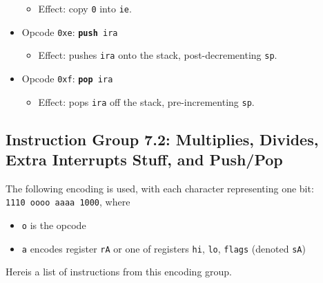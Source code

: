 \documentclass{article}
\begin{document}
\begin{itemize}
\begin{itemize}
			\item Effect:  copy \texttt{0} into \texttt{ie}.
		\end{itemize}
		\item Opcode \texttt{0xe}:
			\texttt{\textbf{push} ira}
		\begin{itemize}
			\item Effect:  pushes \texttt{ira} onto the stack,
			post-decrementing \texttt{sp}.
		\end{itemize}
		\item Opcode \texttt{0xf}:
			\texttt{\textbf{pop} ira}
		\begin{itemize}
			\item Effect:  pops \texttt{ira} off the stack,
			pre-incrementing \texttt{sp}.
		\end{itemize}
	\end{itemize}
	\doublespacing

	\subsection{Instruction Group 7.2:  Multiplies, Divides,
	Extra Interrupts Stuff, and Push/Pop}
	The following encoding is used, with each character representing one
	bit:  \\
	\texttt{1110 oooo aaaa 1000}, where

	\singlespacing
	\begin{itemize}
		\item \texttt{o} is the opcode
		\item \texttt{a} encodes register \texttt{rA} or one of registers 
		\texttt{hi}, \texttt{lo}, \texttt{flags} (denoted \texttt{sA})
	\end{itemize}
	\doublespacing

	Hereis a list of instructions from this encoding group.
\end{document}
